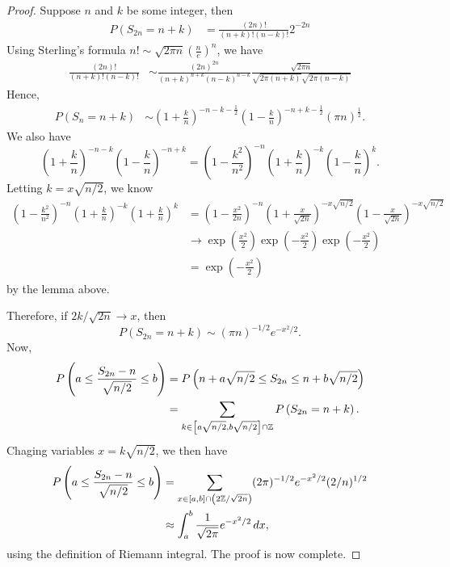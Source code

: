 \documentclass[a4paper]{article}
\begin{document}
\begin{proof}
  Suppose $n$ and $k$ be some integer, then
  \begin{align*}
    P \left( S_{2n} = n + k \right)
     & = \frac{(2n) !}{(n + k) ! (n - k)!} 2^{-2n}
  \end{align*}
  Using Sterling's formula $n! \sim \sqrt{2 \pi n} (\frac{n}{e})^n$,
  we have
  \begin{align*}
    \frac{(2n) !}{(n + k) ! (n - k)!}
     & \sim \frac{ (2n)^{2n} }{(n + k)^{n + k} (n - k)^{n - k}}
    \frac{\sqrt{2 \pi n}}{\sqrt{2 \pi (n + k)} \sqrt{2 \pi (n - k)}}
  \end{align*}
  Hence,
  \begin{align*}
    P \left( S_n = n + k \right)
     & \sim \left( 1 + \frac{k}{n} \right)^{- n - k - \frac{1}{2}}
    \left( 1 - \frac{k}{n} \right)^{-n + k - \frac{1}{2}}
    \left( \pi n \right)^{\frac{1}{2}}.
  \end{align*}
  We also have
  \[
    \left( 1 + \frac{k}{n} \right)^{- n - k}
    \left( 1 - \frac{k}{n} \right)^{-n + k}
    = \left( 1 - \frac{k^2}{n^2} \right)^{-n}
    \left( 1 + \frac{k}{n} \right)^{-k}
    \left( 1 - \frac{k}{n} \right)^{k}.
  \]
  Letting $k = x \sqrt{n / 2}$, we know
  \begin{align*}
    \left( 1 - \frac{k^2}{n^2} \right)^{-n}
    \left( 1 + \frac{k}{n} \right)^{-k}
    \left( 1 + \frac{k}{n} \right)^{k}
     & = \left( 1 - \frac{x^2}{2 n} \right)^{-n}
    \left( 1 + \frac{x}{\sqrt{2n}} \right)^{- x \sqrt{n/2}}
    \left( 1 - \frac{x}{\sqrt{2n}} \right)^{- x \sqrt{n/2}} \\
     & \to \exp \left( \frac{x^2}{2} \right)
    \exp \left( - \frac{x^2}{2} \right)
    \exp \left( - \frac{x^2}{2} \right)                     \\
     & = \exp \left( - \frac{x^2}{2} \right)
  \end{align*}
  by the lemma above.

  Therefore, if $2k / \sqrt{2n} \to x$, then
  \[
    P \left( S_{2n} = n + k \right)
    \sim \left( \pi n \right)^{- 1 / 2} e^{- x^2 / 2}.
  \]
  Now,
  \begin{align*}
    P \left( a \leq \frac{S_{2n} - n}{ \sqrt{n / 2} } \leq b \right)
     & = P \left( n + a \sqrt{n / 2} \leq S_{2n} \leq n + b \sqrt{n / 2} \right) \\
     & = \sum_{k \in \left[ a \sqrt{n / 2}, b \sqrt{n / 2} \right] \cap \mathbb{Z}}
    P \left( S_{2n} = n + k \right).
  \end{align*}
  Chaging variables $x = k \sqrt{n / 2}$, we then have
  \begin{align*}
    P \left( a \leq \frac{S_{2n} - n}{\sqrt{n / 2}} \leq b \right)
     & = \sum_{x \in [a, b] \cap \left( 2\mathbb{Z} / \sqrt{2n} \right)}
         (2 \pi)^{- 1 / 2} e^{-x^2 / 2} (2 / n)^{1 / 2}  \\
     & \approx \int_a^b \frac{1}{\sqrt{2 \pi}} e^{-x^2 / 2} \, d x,
  \end{align*}
  using the definition of Riemann integral. The proof is
  now complete.

\end{proof}
\end{document}
